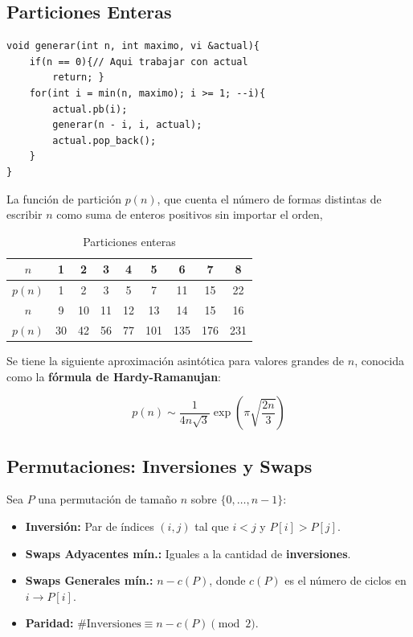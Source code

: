 \subsection{Particiones Enteras}


\begin{verbatim}
void generar(int n, int maximo, vi &actual){
    if(n == 0){// Aqui trabajar con actual
        return; }
    for(int i = min(n, maximo); i >= 1; --i){
        actual.pb(i);
        generar(n - i, i, actual);
        actual.pop_back();
    }
}
\end{verbatim}
La función de partición \( p(n) \), que cuenta el número de formas distintas de escribir \( n \) como suma de enteros positivos sin importar el orden,

\begin{table}[H]
	\centering
	\begin{tabular}{|c|cccccccc|}
		\hline
		$n$ & 1 & 2 & 3 & 4 & 5 & 6 & 7 & 8\\
		\hline
		$p(n)$ & 1 & 2 & 3 & 5 & 7 & 11 & 15 & 22\\
		\hline
		\hline
		$n$ & 9 & 10 & 11 & 12 & 13 & 14 & 15 & 16 \\
		\hline
		 $p(n)$ & 30 & 42 & 56 & 77 & 101 & 135 & 176 & 231\\
		\hline
	\end{tabular}
	\caption{Particiones enteras}
\end{table}

Se tiene la siguiente aproximación asintótica para valores grandes de $n$, conocida como la \textbf{fórmula de Hardy-Ramanujan}:

\[
p(n) \sim \frac{1}{4n\sqrt{3}} \exp\left( \pi \sqrt{\frac{2n}{3}} \right)
\]


\subsection{Permutaciones: Inversiones y Swaps}

Sea $P$ una permutación de tamaño $n$ sobre $\{0, \dots, n-1\}$:
\begin{itemize}[noitemsep]
    \item \textbf{Inversión:} Par de índices $(i, j)$ tal que $i < j$ y $P[i] > P[j]$.
    \item \textbf{Swaps Adyacentes mín.:} Iguales a la cantidad de \textbf{inversiones}.
    \item \textbf{Swaps Generales mín.:} $n - c(P)$, donde $c(P)$ es el número de ciclos en $i \to P[i]$.
    \item \textbf{Paridad:} $\#\text{Inversiones} \equiv n - c(P) \pmod 2$.
\end{itemize}

